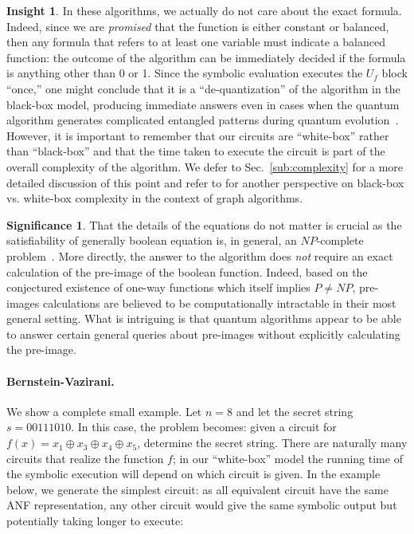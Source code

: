 \documentclass[sigplan,screen]{acmart}
\theoremstyle{definition}
\newtheorem*{insight}{Insight}
\newtheorem*{signif}{Significance}
\begin{document}
\begin{insight} In these algorithms, we actually do not care about the
  exact formula. Indeed, since we are \emph{promised} that the
  function is either constant or balanced, then any formula that
  refers to at least one variable must indicate a balanced function:
  the outcome of the algorithm can be immediately decided if the
  formula is anything other than 0 or 1.  Since the symbolic
  evaluation executes the $U_f$ block ``once,'' one might conclude
  that it is a ``de-quantization'' of the algorithm in the black-box
  model, producing immediate answers even in cases when the quantum
  algorithm generates complicated entangled patterns during quantum
  evolution~\cite{djdeq}. However, it is important to remember that
  our circuits are ``white-box'' rather than ``black-box'' and that
  the time taken to execute the circuit is part of the overall
  complexity of the algorithm. We defer to Sec.~\ref{sub:complexity}
  for a more detailed discussion of this point and refer to
  \citet{10.1145/3341106} for another perspective on black-box
  vs. white-box complexity in the context of graph algorithms.
\end{insight}

\begin{signif}
  That the details of the equations do not matter is crucial as the
  satisfiability of generally boolean equation is, in general, an
  $\mathit{NP}$-complete
  problem~\cite{4640789,Karp1972,10.1145/800157.805047}. More
  directly, the answer to the algorithm does \emph{not} require an
  exact calculation of the pre-image of the boolean function. Indeed,
  based on the conjectured existence of one-way functions which itself
  implies $\mathit{P} \neq \mathit{NP}$, pre-images calculations are
  believed to be computationally intractable in their most general
  setting.  What is intriguing is that quantum algorithms appear to be
  able to answer certain general queries about pre-images without
  explicitly calculating the pre-image.
\end{signif}

\paragraph*{Bernstein-Vazirani.}
We show a complete small example. Let $n=8$ and let the secret string
$s = 00111010$. In this case, the problem becomes: given a circuit for
$f(x) = x_1 \oplus x_3 \oplus x_4 \oplus x_5$, determine the secret
string. There are naturally many circuits that realize the function
$f$; in our ``white-box'' model the running time of the symbolic
execution will depend on which circuit is given. In the example below,
we generate the simplest circuit: as all equivalent circuit have the
same ANF representation, any other circuit would give the same
symbolic output but potentially taking longer to execute:
\end{document}
